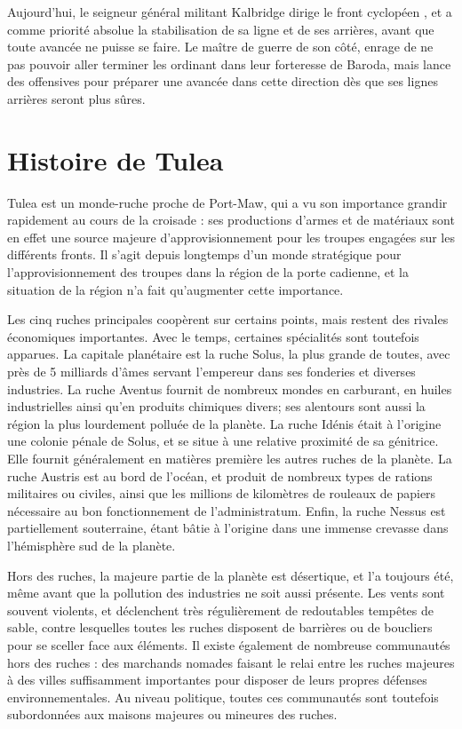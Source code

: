 \documentclass[10pt,a4paper]{book}
\newcommand{\zone}{Tulea }
\newcommand{\front}{front cyclopéen }
\begin{document}
Aujourd'hui, le seigneur général militant Kalbridge dirige le \front , et a comme priorité absolue la stabilisation de sa ligne et de ses arrières, avant que toute avancée ne puisse se faire. Le maître de guerre de son côté, enrage de ne pas pouvoir aller terminer les ordinant dans leur forteresse de Baroda, mais lance des offensives pour préparer une avancée dans cette direction dès que ses lignes arrières seront plus sûres.
\chapter{Histoire de \zone}
\zone est un monde-ruche proche de Port-Maw, qui a vu son importance grandir rapidement au cours de la croisade : ses productions d'armes et de matériaux sont en effet une source majeure d'approvisionnement pour les troupes engagées sur les différents fronts. Il s'agit depuis longtemps d'un monde stratégique pour l'approvisionnement des troupes dans la région de la porte cadienne, et la situation de la région n'a fait qu'augmenter cette importance.

Les cinq ruches principales coopèrent sur certains points, mais restent des rivales économiques importantes. Avec le temps, certaines spécialités sont toutefois apparues. La capitale planétaire est la ruche Solus, la plus grande de toutes, avec près de 5 milliards d'âmes servant l'empereur dans ses fonderies et diverses industries. La ruche Aventus fournit de nombreux mondes en carburant, en huiles industrielles ainsi qu'en produits chimiques divers; ses alentours sont aussi la région la plus lourdement polluée de la planète. La ruche Idénis était à l'origine une colonie pénale de Solus, et se situe à une relative proximité de sa génitrice. Elle fournit généralement en matières première les autres ruches de la planète. La ruche Austris est au bord de l'océan, et produit de nombreux types de rations militaires ou civiles, ainsi que les millions de kilomètres de rouleaux de papiers nécessaire au bon fonctionnement de l'administratum. Enfin, la ruche Nessus est partiellement souterraine, étant bâtie à l'origine dans une immense crevasse dans l'hémisphère sud de la planète.

Hors des ruches, la majeure partie de la planète est désertique, et l'a toujours été, même avant que la pollution des industries ne soit aussi présente. Les vents sont souvent violents, et déclenchent très régulièrement de redoutables tempêtes de sable, contre lesquelles toutes les ruches disposent de barrières ou de boucliers pour se sceller face aux éléments. Il existe également de nombreuse communautés hors des ruches : des marchands nomades faisant le relai entre les ruches majeures à des villes suffisamment importantes pour disposer de leurs propres défenses environnementales. Au niveau politique, toutes ces communautés sont toutefois subordonnées aux maisons majeures ou mineures des ruches.
\end{document}
